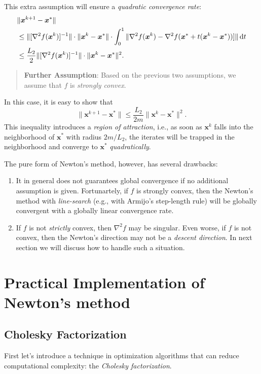 This extra assumption will ensure a \emph{quadratic convergence rate}:
\begin{align*}
&\|\bm x^{k+1} - \bm x^*\|\\&\le
\|[\nabla^2f(\bm x^k)]^{-1}\|\cdot \|\bm x^{k} - \bm x^*\|\cdot \int_0^1
\|\nabla^2f(\bm x^k) - \nabla^2f(\bm x^* + t(\bm x^k - \bm x^*))]\|\,\mathrm{d} t\\
&\le\frac{L_2}{2}\|[\nabla^2f(\bm x^k)]^{-1}\|\cdot \|\bm x^{k} - \bm x^*\|^2.
\end{align*}

\begin{quotation}
\textbf{Further Assumption}:
Based on the previous two assumptions, we assume that $f$ is \emph{strongly convex}.
\end{quotation}
In this case, it is easy to show that
\[
\|\bm x^{k+1} - \bm x^*\|\le\frac{L_2}{2m}\|\bm x^k - \bm x^*\|^2.
\]
This inequality introduces a \emph{region of attraction}, i.e., 
as soon as $\bm x^k$ falls into the neighborhood of $\bm x^*$ with radius $2m/L_2$, the iterates will be trapped in the neighborhood and converge to $\bm x^*$ \emph{quadratically}.

\begin{remark}
The pure form of Newton's method, however, has several drawbacks:
\begin{enumerate}
\item
It in general does not guarantees global convergence if no additional assumption is given.
Fortunartely, if $f$ is strongly convex, then the Newton's method with \emph{line-search} (e.g., with Armijo's step-length rule) will be globally convergent with a globally linear convergence rate.
\item
If $f$ is not \emph{strictly} convex, then $\nabla^2f$ may be singular. Even worse, if $f$ is not convex, then the Newton's direction may not be a \emph{descent direction}. In next section we will discuss how to handle such a situation.
\end{enumerate}
\end{remark}

\section{Practical Implementation of Newton's method}
\subsection{Cholesky Factorization}
First let's introduce a technique in optimization algorithms that can reduce computational complexity: the \emph{Cholesky factorization}.

